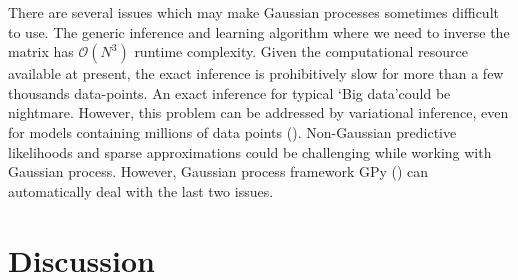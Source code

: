 There are several issues which may make Gaussian processes sometimes difficult to use. The generic inference and learning algorithm where we need to inverse the matrix has $\mathcal{O}\left(N^3\right)$ runtime complexity. Given the computational resource available at present, the exact inference is prohibitively slow for more than a few thousands data-points. An exact inference for typical \lq Big data\rq  could be nightmare. However, this problem can be addressed by variational inference, even for models containing millions of data points (\cite{Hensman:2013a}). Non-Gaussian predictive likelihoods and sparse approximations could be challenging while working with Gaussian process. However, Gaussian process framework GPy (\cite{gpy2014}) can automatically deal with the last two issues. 

\section{Discussion}
